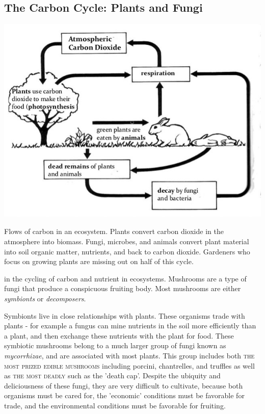 \documentclass{tufte-handout}
\begin{document}
\subsection{The Carbon Cycle: Plants and Fungi}

\begin{marginfigure}
\includegraphics{c-cycle.jpg}
\caption{Flows of carbon in an ecosystem.
Plants convert carbon dioxide in the atmosphere into biomass. Fungi, microbes, and animals convert plant material into soil organic matter, nutrients, and back to carbon dioxide.
Gardeners who focus on growing plants are missing out on half of this cycle.}
\end{marginfigure}

 in the cycling of carbon and nutrient in ecosystems. Mushrooms are a type of fungi that produce a conspicuous 
fruiting body. Most mushrooms are either \emph{symbionts} or \emph{decomposers}.

Symbionts live in close relationships with plants. 
These organisms trade with plants - for example a fungus can mine nutrients in the soil more efficiently than a plant, and then exchange these nutrients with the plant for food.
These symbiotic mushrooms belong to a much larger group of fungi known as \emph{mycorrhizae}, and are associated with most plants. This group includes both \textsc{the most prized edible mushrooms} including porcini, chantrelles, and truffles as well as \textsc{the most deadly} such as the 'death cap'. 
Despite the ubiquity and deliciousness of these fungi, they are very difficult to cultivate, because both organisms must be cared for, the 'economic' conditions must be favorable for trade, and the environmental conditions must be favorable for fruiting.
\end{document}
